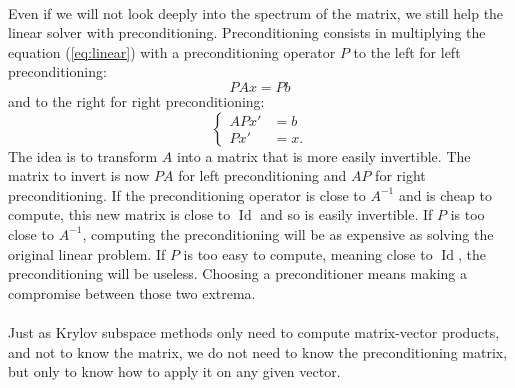       \paragraph{}
      Even if we will not look deeply into the spectrum of the matrix, we still help the linear solver with preconditioning.
      Preconditioning consists in multiplying the equation (\ref{eq:linear}) with a preconditioning operator $P$ to the left for left preconditioning:
      \begin{equation}
        PAx = Pb
      \end{equation}
      and to the right for right preconditioning:
      \begin{equation}
        \left\{\begin{aligned} APx' &= b \\	Px' &= x .\end{aligned}\right.
      \end{equation}
      The idea is to transform $A$ into a matrix that is more easily invertible.
      The matrix to invert is now $PA$ for left preconditioning and $AP$ for right preconditioning.
      If the preconditioning operator is close to $A^{-1}$ and is cheap to compute, this new matrix is close to $\operatorname{Id}$ and so is easily invertible.
      If $P$ is too close to $A^{-1}$, computing the preconditioning will be as expensive as solving the original linear problem.
      If $P$ is too easy to compute, meaning close to $\operatorname{Id}$, the preconditioning will be useless.
      Choosing a preconditioner means making a compromise between those two extrema.

      \paragraph{}
      Just as Krylov subspace methods only need to compute matrix-vector products, and not to know the matrix, we do not need to know the preconditioning matrix, but only to know how to apply it on any given vector.

